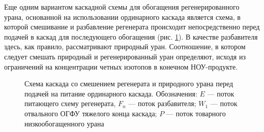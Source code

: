 Еще одним вариантом каскадной схемы для обогащения регенерированного урана, основанной на использовании ординарного каскада является схема, в которой смешивание и разбавление регенерата происходит непосредственно перед подачей в каскад для последующего обогащения (рис. \ref{o3}). В качестве разбавителя здесь, как правило, рассматривают природный уран. Соотношение, в котором следует смешать природный и регенерированный уран определяют, исходя из ограничений на концентрации четных изотопов в конечном НОУ-продукте.

\begin{figure}[ht]
  \caption{Схема каскада со смешением регенерата и природного урана перед подачей на питание ординарного каскада. Обозначения: $E$ --- поток питающего схему регенерата, $F_n$ --- поток разбавителя; $W_1$ --- поток отвального ОГФУ тяжелого конца каскада; $P$ --- поток товарного низкообогащенного урана}\label{o3}
\end{figure}

